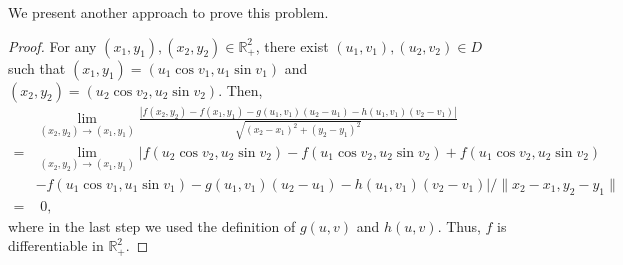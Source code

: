 \documentclass[11pt]{article}
\theoremstyle{definition}
\numberwithin{equation}{subsection}
\begin{document}
We present another approach to prove this problem.
\begin{proof}
For any $(x_1, y_1), (x_2, y_2) \in \mathbb{R}^2_+$, there exist $(u_1, v_1), (u_2, v_2) \in D$ such that $(x_1, y_1) = (u_1 \cos v_1, u_1 \sin v_1)$ and $(x_2, y_2) = (u_2 \cos v_2, u_2 \sin v_2)$. Then,
\begin{align*}
    & \lim_{(x_2,y_2) \to (x_1,y_1)} \frac{\left|f(x_2,y_2) - f(x_1,y_1) - g(u_1,v_1)(u_2 - u_1) - h(u_1,v_1)(v_2 - v_1) \right|}{\sqrt{(x_2-x_1)^2 + (y_2-y_1)^2}} \\
    = & \lim_{(x_2,y_2) \to (x_1,y_1)} | f(u_2 \cos v_2, u_2 \sin v_2) - f(u_1 \cos v_2, u_2 \sin v_2) + f(u_1 \cos v_2, u_2 \sin v_2) \\
    & - f(u_1 \cos v_1, u_1 \sin v_1) - g(u_1,v_1)(u_2 - u_1) - h(u_1,v_1)(v_2 - v_1)| / \|x_2-x_1, y_2-y_1\| \\
    = &\,\,  0,
\end{align*}
where in the last step we used the definition of $g(u,v)$ and $h(u,v)$. Thus, $f$ is differentiable in $\mathbb{R}^2_+$.
\end{proof}

\medskip
\end{document}
